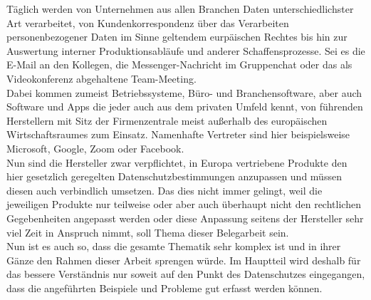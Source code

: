 Täglich werden von Unternehmen aus allen Branchen Daten unterschiedlichster Art verarbeitet, von Kundenkorrespondenz über das Verarbeiten personenbezogener Daten im Sinne geltendem eurpäischen Rechtes bis hin zur Auswertung interner Produktionsabläufe und anderer Schaffensprozesse. Sei es die E-Mail an den Kollegen, die Messenger-Nachricht im Gruppenchat oder das als Videokonferenz abgehaltene Team-Meeting.\\
Dabei kommen zumeist Betriebssysteme, Büro- und Branchensoftware, aber auch Software und Apps die jeder auch aus dem privaten Umfeld kennt, von führenden Herstellern mit Sitz der Firmenzentrale meist außerhalb des europäischen Wirtschaftsraumes zum Einsatz. Namenhafte Vertreter sind hier beispielsweise Microsoft, Google, Zoom oder Facebook.\\
Nun sind die Hersteller zwar verpflichtet, in Europa vertriebene Produkte den hier gesetzlich geregelten Datenschutzbestimmungen anzupassen und müssen diesen auch verbindlich umsetzen. Das dies nicht immer gelingt, weil die jeweiligen Produkte nur teilweise oder aber auch überhaupt nicht den rechtlichen Gegebenheiten angepasst werden oder diese Anpassung seitens der Hersteller sehr viel Zeit in Anspruch nimmt, soll Thema dieser Belegarbeit sein.\\
Nun ist es auch so, dass die gesamte Thematik sehr komplex ist und in ihrer Gänze den Rahmen dieser Arbeit sprengen würde. Im Hauptteil wird deshalb für das bessere Verständnis nur soweit auf den Punkt des Datenschutzes eingegangen, dass die angeführten Beispiele und Probleme gut erfasst werden können. 
